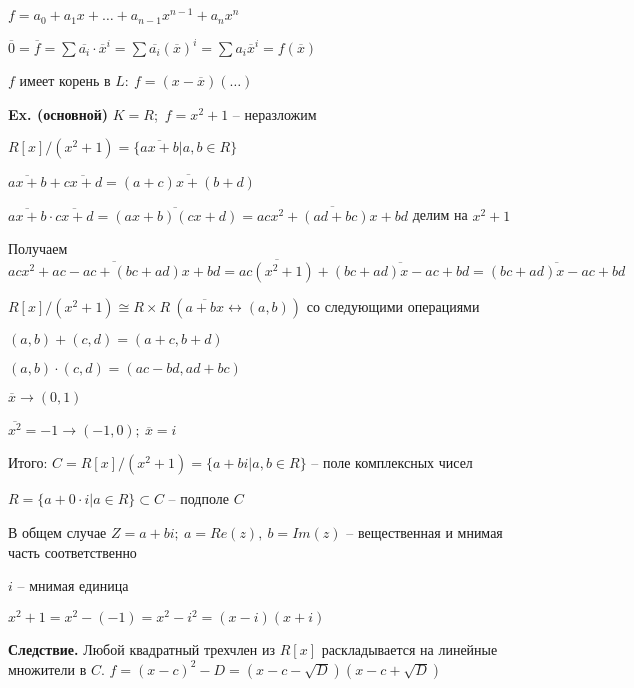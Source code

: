 \documentclass[14pt, letter paper]{article}
\begin{document}
$f = a_0 + a_1x + \ldots + a_{n-1}x^{n-1} + a_nx^n$

$\overline{0} = \overline{f} = \sum \overline{a_i} \cdot \overline{x}^i = \sum \overline{a_i} (\overline{x})^i = \sum a_i \overline{x}^i = f(\overline{x})$

$f$ имеет корень в $L:\ f = (x - \overline{x})(\ldots)$

\textbf{Ex. (основной)} $K = R$;\ $f = x^2 + 1$ -- неразложим

$R[x]/(x^2 + 1) = \{\overline{ax + b} | a, b \in R\}$

$\overline{ax + b} + \overline{cx + d} = \overline{(a + c)x + (b + d)}$

$\overline{ax + b} \cdot \overline{cx + d} = \overline{(ax + b)(cx + d)} = \overline{acx^2 + (ad + bc)x + bd}$ делим на $x^2 + 1$ 

Получаем $\overline{acx^2 + ac - ac + (bc + ad)x + bd} = \overline{ac(x^2 + 1)} + \overline{(bc + ad)x - ac + bd} = \overline{(bc + ad)x - ac + bd}$

\vspace{2mm}

$R[x]/(x^2 + 1) \cong R \times R\ (\overline{a + bx} \leftrightarrow (a, b))$ со следующими операциями

$(a, b) + (c, d) = (a + c, b + d)$

$(a, b) \cdot (c, d) = (ac - bd, ad + bc)$

\vspace{3mm}

$\overline{x} \rightarrow (0, 1)$

$\overline{x^2} = -1 \rightarrow (-1, 0);\ \overline{x} = i$

Итого: $C = R[x]/(x^2 + 1) = \{ a + bi | a, b \in R\}$ -- поле комплексных чисел

\vspace{5mm}

$R = \{ a + 0 \cdot i | a \in R\} \subset C$ -- подполе $C$

В общем случае $Z = a + bi;\ a = Re(z),\ b = Im(z)$ -- вещественная и мнимая часть соответственно

$i$ -- мнимая единица

$x^2 + 1 = x^2 - (- 1) = x^2 - i^2 = (x - i)(x + i)$

\vspace{5mm}

\textbf{Следствие.} Любой квадратный трехчлен из $R[x]$ раскладывается на линейные множители в $C$. $f = (x - c)^2 - D = (x - c - \sqrt{D})(x - c + \sqrt{D})$
\end{document}
